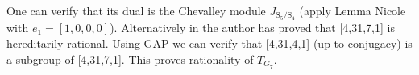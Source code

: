 \documentclass{article}
\theoremstyle{plain}
\theoremstyle{definition}
\newcommand{\tand}{\ensuremath{\,\,\, \text{and} \,\,\,}}
\begin{document}
One can verify that its dual is the Chevalley module $J_{\mathrm{S}_5/\mathrm{S}_4}$ (apply Lemma Nicole with $e_1 = [1,0,0,0] $).
Alternatively in \cite{Nicole1} the author has proved that [4,31,7,1] is hereditarily rational. Using GAP we can verify that [4,31,4,1] (up to conjugacy) is a subgroup of [4,31,7,1]. This proves rationality of $T_{G_7}$.
%
\end{document}
